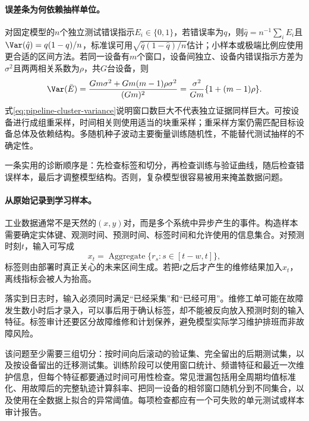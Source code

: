 \paragraph{误差条为何依赖抽样单位。}
对固定模型的$n$个独立测试错误指示$E_i\in\{0,1\}$，若错误率为$q$，则$\hat q=n^{-1}\sum_iE_i$且$\Var(\hat q)=q(1-q)/n$，标准误可用$\sqrt{\hat q(1-\hat q)/n}$估计；小样本或极端比例应使用更合适的区间方法。若同一设备有$m$个窗口，设备间独立、设备内错误指示方差为$\sigma^2$且两两相关系数为$\rho$，共$G$台设备，则
\begin{equation}
 \Var(\bar E)=\frac{Gm\sigma^2+Gm(m-1)\rho\sigma^2}{(Gm)^2}
 =\frac{\sigma^2}{Gm}\{1+(m-1)\rho\}.\label{eq:pipeline-cluster-variance}
\end{equation}
式\eqref{eq:pipeline-cluster-variance}说明窗口数巨大不代表独立证据同样巨大。可按设备进行成组重采样，时间相关则使用适当的块重采样；重采样方案仍需匹配目标设备总体及依赖结构。多随机种子波动主要衡量训练随机性，不能替代测试抽样的不确定性。

\begin{remark}
 一条实用的诊断顺序是：先检查标签和切分，再检查训练与验证曲线，随后检查错误样本，最后才调整模型结构。否则，复杂模型很容易被用来掩盖数据问题。
\end{remark}

\paragraph{从原始记录到学习样本。}
工业数据通常不是天然的$(x,y)$对，而是多个系统中异步产生的事件。构造样本需要确定实体键、观测时间、预测时间、标签时间和允许使用的信息集合。对预测时刻$t$，输入可写成
\begin{equation}
 x_t=\operatorname{Aggregate}\{r_s:s\in[t-w,t]\},
\end{equation}
标签则由部署时真正关心的未来区间生成。若把$t$之后才产生的维修结果加入$x_t$，离线指标会被人为抬高。

落实到日志时，输入必须同时满足“已经采集”和“已经可用”。维修工单可能在故障发生数小时后才录入，可以事后用于确认标签，却不能被反向放入预测时刻的输入特征。标签审计还要区分故障维修和计划保养，避免模型实际学习维护排班而非故障风险。

该问题至少需要三组切分：按时间向后滚动的验证集、完全留出的后期测试集，以及按设备留出的迁移测试集。训练阶段可以使用窗口统计、频谱特征和最近一次维护信息，但每个特征都要通过时间可用性检查。常见泄漏包括用全周期均值标准化、用故障后的完整轨迹计算斜率、把同一设备的相邻窗口随机分到不同集合，以及使用在全数据上拟合的异常阈值。每项检查都应有一个可失败的单元测试或样本审计报告。

